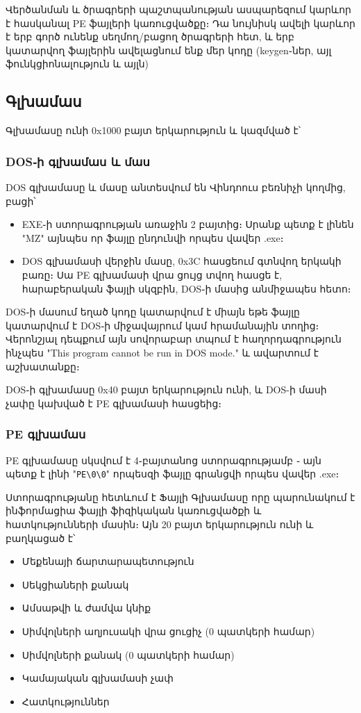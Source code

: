 \documentclass[12pt]{article}
\begin{document}
\begin{sloppypar}
Վերծանման և ծրագրերի պաշտպանության ասպարեզում կարևոր է հասկանալ PE ֆայլերի
կառուցվածքը։ Դա նույնիսկ ավելի կարևոր է երբ գործ ունենք սեղմող/բացող ծրագրերի
հետ, և երբ կատարվող ֆայլերին ավելացնում ենք մեր կոդը (keygen֊ներ, այլ
ֆունկցիոնալություն և այլն)

\subsection{Գլխամաս}
Գլխամասը ունի 0x1000 բայտ երկարություն և կազմված է՝

\subsubsection{DOS֊ի գլխամաս և մաս}
DOS գլխամասը և մասը անտեսվում են Վինդոուս բեռնիչի կողմից, բացի՝

\begin{itemize}
\item EXE֊ի ստորագրության առաջին 2 բայտից։ Սրանք պետք է լինեն "MZ" այնպես որ
	ֆայլը ընդունվի որպես վավեր .exe։
\item DOS գլխամասի վերջին մասը, 0x3C հասցեում գտնվող երկակի բառը։ Սա
	PE գլխամասի վրա ցույց տվող հասցե է, հարաբերական ֆայլի սկզբին, DOS֊ի մասից
	անմիջապես հետո։ 
\end{itemize}

DOS֊ի մասում եղած կոդը կատարվում է միայն եթե ֆայլը կատարվում է DOS֊ի
միջավայրում կամ հրամանային տողից։ Վերոնշյալ դեպքում այն սովորաբար տպում է
հաղորդագրություն ինչպես "This program cannot be run in DOS mode." և ավարտում է
աշխատանքը։

DOS֊ի գլխամասը 0x40 բայտ երկարություն ունի, և DOS-ի մասի չափը կախված է
PE գլխամասի հասցեից։

\subsubsection{PE գլխամաս}
PE գլխամասը սկսվում է 4֊բայտանոց ստորագրությամբ ֊ այն պետք է լինի
"\texttt{PE\textbackslash0\textbackslash0}" որպեսզի ֆայլը գրանցվի որպես
վավեր .exe։

Ստորագրությանը հետևում է Ֆայլի Գլխամասը որը պարունակում է ինֆորմացիա
ֆայլի ֆիզիկական կառուցվածքի և հատկությունների մասին։ Այն 20 բայտ երկարություն
ունի և բաղկացած է՝

\begin{itemize}
\item Մեքենայի ճարտարապետություն
\item Սեկցիաների քանակ
\item Ամսաթվի և ժամվա կնիք
\item Սիմվոլների աղյուսակի վրա ցուցիչ (0 պատկերի համար)
\item Սիմվոլների քանակ (0 պատկերի համար)
\item Կամայական գլխամասի չափ
\item Հատկություններ
\end{itemize}


\end{sloppypar}
\end{document}
